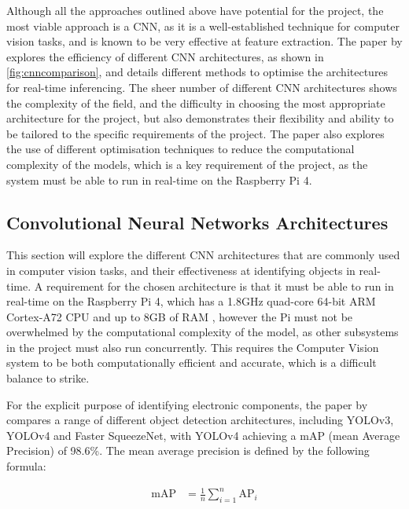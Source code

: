 Although all the approaches outlined above have potential for the project, the most viable approach is a CNN, as it is a well-established technique for computer vision tasks, and is known to be very effective at feature extraction. The paper by \citet{electronics11060945} explores the efficiency of different CNN architectures, as shown in \autoref{fig:cnncomparison}, and details different methods to optimise the architectures for real-time inferencing. The sheer number of different CNN architectures shows the complexity of the field, and the difficulty in choosing the most appropriate architecture for the project,  but also demonstrates their flexibility and ability to be tailored to the specific requirements of the project. The paper also explores the use of different optimisation techniques to reduce the computational complexity of the models, which is a key requirement of the project, as the system must be able to run in real-time on the Raspberry Pi 4. 

\subsection{Convolutional Neural Networks Architectures}
\label{sec:background-computer-vision}
This section will explore the different CNN architectures that are commonly used in computer vision tasks, and their effectiveness at identifying objects in real-time. A requirement for the chosen architecture is that it must be able to run in real-time on the Raspberry Pi 4, which has a 1.8GHz quad-core 64-bit ARM Cortex-A72 CPU and up to 8GB of RAM \cite{pi4}, however the Pi must not be overwhelmed by the computational complexity of the model, as other subsystems in the project must also run concurrently. This requires the Computer Vision system to be both computationally efficient and accurate, which is a difficult balance to strike.

For the explicit purpose of identifying electronic components, the paper by \citet{s22239079} compares a range of different object detection architectures, including YOLOv3, YOLOv4 and Faster SqueezeNet, with YOLOv4 achieving a mAP (mean Average Precision) of 98.6\%. The mean average precision is defined by the following formula:

{\fontsize{14pt}{11pt}\selectfont
\begin{align*}
    \text{mAP} &= \frac{1}{n} \sum_{i=1}^{n} \text{AP}_i %
\end{align*}
}

